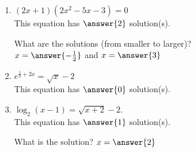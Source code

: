 \documentclass{ximera}
\begin{document}
\begin{exercise}
\begin{enumerate}
\item $(2x+1)(2x^2-5x-3)=0$ \\
This equation has $\answer{2}$ solution(s).
\begin{exercise}
What are the solutions (from smaller to larger)?\\
$x=\answer{-\frac{1}{2}}$ and $x=\answer{3}$
\end{exercise}

\item $e^{\frac{1}{3} + 2x}=\sqrt{x}-2$ \\
This equation has $\answer{0}$ solution(s).

\item $\log_2(x-1) =\sqrt{x+2}-2$. \\
This equation has $\answer{1}$ solution(s).
\begin{exercise}
What is the solution?
$x=\answer{2}$
\end{exercise}


\end{enumerate}
\end{exercise}
\end{document}
